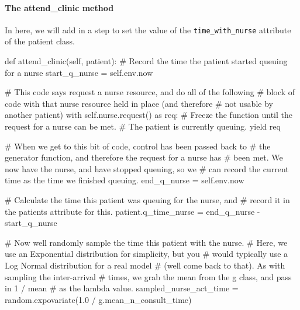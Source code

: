 \documentclass[
  letterpaper,
  DIV=11,
  numbers=noendperiod]{scrreprt}
\let\oldparagraph\paragraph
\renewcommand{\paragraph}[1]{\oldparagraph{#1}\mbox{}}
\newenvironment{Shaded}{\begin{snugshade}}{\end{snugshade}}
\newcommand{\CommentTok}[1]{\textcolor[rgb]{0.37,0.37,0.37}{#1}}
\newcommand{\ControlFlowTok}[1]{\textcolor[rgb]{0.00,0.23,0.31}{#1}}
\newcommand{\FloatTok}[1]{\textcolor[rgb]{0.68,0.00,0.00}{#1}}
\newcommand{\ImportTok}[1]{\textcolor[rgb]{0.00,0.46,0.62}{#1}}
\newcommand{\KeywordTok}[1]{\textcolor[rgb]{0.00,0.23,0.31}{#1}}
\newcommand{\NormalTok}[1]{\textcolor[rgb]{0.00,0.23,0.31}{#1}}
\newcommand{\OperatorTok}[1]{\textcolor[rgb]{0.37,0.37,0.37}{#1}}
\newcommand{\VariableTok}[1]{\textcolor[rgb]{0.07,0.07,0.07}{#1}}
\begin{document}
\paragraph{The attend\_clinic method}\label{the-attend_clinic-method-4}

In here, we will add in a step to set the value of the
\texttt{time\_with\_nurse} attribute of the patient class.

\begin{Shaded}
\begin{Highlighting}[]
\KeywordTok{def}\NormalTok{ attend\_clinic(}\VariableTok{self}\NormalTok{, patient):}
    \CommentTok{\# Record the time the patient started queuing for a nurse}
\NormalTok{    start\_q\_nurse }\OperatorTok{=} \VariableTok{self}\NormalTok{.env.now}

    \CommentTok{\# This code says request a nurse resource, and do all of the following}
    \CommentTok{\# block of code with that nurse resource held in place (and therefore}
    \CommentTok{\# not usable by another patient)}
    \ControlFlowTok{with} \VariableTok{self}\NormalTok{.nurse.request() }\ImportTok{as}\NormalTok{ req:}
        \CommentTok{\# Freeze the function until the request for a nurse can be met.}
        \CommentTok{\# The patient is currently queuing.}
        \ControlFlowTok{yield}\NormalTok{ req}

        \CommentTok{\# When we get to this bit of code, control has been passed back to}
        \CommentTok{\# the generator function, and therefore the request for a nurse has}
        \CommentTok{\# been met.  We now have the nurse, and have stopped queuing, so we}
        \CommentTok{\# can record the current time as the time we finished queuing.}
\NormalTok{        end\_q\_nurse }\OperatorTok{=} \VariableTok{self}\NormalTok{.env.now}

        \CommentTok{\# Calculate the time this patient was queuing for the nurse, and}
        \CommentTok{\# record it in the patient\textquotesingle{}s attribute for this.}
\NormalTok{        patient.q\_time\_nurse }\OperatorTok{=}\NormalTok{ end\_q\_nurse }\OperatorTok{{-}}\NormalTok{ start\_q\_nurse}

        \CommentTok{\# Now we\textquotesingle{}ll randomly sample the time this patient with the nurse.}
        \CommentTok{\# Here, we use an Exponential distribution for simplicity, but you}
        \CommentTok{\# would typically use a Log Normal distribution for a real model}
        \CommentTok{\# (we\textquotesingle{}ll come back to that).  As with sampling the inter{-}arrival}
        \CommentTok{\# times, we grab the mean from the g class, and pass in 1 / mean}
        \CommentTok{\# as the lambda value.}
\NormalTok{        sampled\_nurse\_act\_time }\OperatorTok{=}\NormalTok{ random.expovariate(}\FloatTok{1.0} \OperatorTok{/}
\NormalTok{                                                    g.mean\_n\_consult\_time)}


\end{Highlighting}
\end{Shaded}
\end{document}
